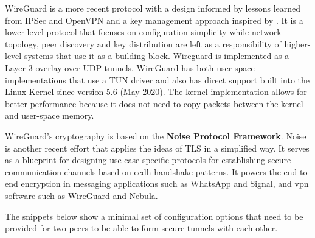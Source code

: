 WireGuard \autocite{donenfeldWireGuardNextGeneration2017} is a more recent protocol with a design informed by lessons learned from IPSec and OpenVPN and a key management approach inspired by . It is a lower-level protocol that focuses on configuration simplicity while network topology, peer discovery and key distribution are left as a responsibility of higher-level systems that use it as a building block. Wireguard is implemented as a Layer 3 overlay over UDP tunnels. WireGuard has both user-space implementations that use a TUN driver and also has direct support built into the Linux Kernel since version 5.6 (May 2020). The kernel implementation allows for better performance because it does not need to copy packets between the kernel and user-space memory.

WireGuard's cryptography is based on the \textbf{Noise Protocol Framework}\autocite{noiseDocs}. Noise is another recent effort that applies the ideas of TLS in a simplified way. It serves as a blueprint for designing use-case-specific protocols for establishing secure communication channels based on \gls{ecdh} handshake patterns. It powers the end-to-end encryption in messaging applications such as WhatsApp and Signal, and \gls{vpn} software such as WireGuard and Nebula.
  

The snippets below show a minimal set of configuration options that need to be provided for two peers to be able to form secure tunnels with each other.

\begin{Shaded}
\begin{Highlighting}[]
\KeywordTok{[Interface]}
\OtherTok{=}
\OtherTok{=}\StringTok{ }
\OtherTok{=}

\KeywordTok{[Peer]}
\OtherTok{=}
\OtherTok{=}
\OtherTok{=}
\end{Highlighting}
\end{Shaded}

\begin{Shaded}
\begin{Highlighting}[]
\KeywordTok{[Interface]}
\OtherTok{=}
\OtherTok{=}\StringTok{ }
\OtherTok{=}

\KeywordTok{[Peer]}
\OtherTok{=}
\OtherTok{=}
\end{Highlighting}
\end{Shaded}

